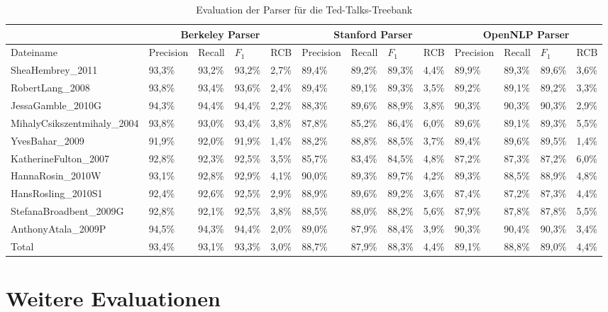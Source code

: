 \begin{sidewaystable}

\begin{tabular}{ | l || l | l | l | l || l | l | l | l || l | l | l | l |}
	\hline
	& \multicolumn{4}{|c||}{Berkeley Parser} & \multicolumn{4}{|c||}{Stanford Parser} & \multicolumn{4}{|c|}{OpenNLP Parser}\\ \hline
	Dateiname & Precision & Recall & \( F_1 \) & RCB & Precision & Recall & \( F_1 \) & RCB & Precision & Recall & \( F_1 \) & RCB  \\
	\hline \hline
	SheaHembrey\_2011 & 93,3\%  & 93,2\% & 93,2\% & 2,7\% & 89,4\% & 89,2\% & 89,3\% & 4,4\% & 89,9\% & 89,3\% & 89,6\% & 3,6\%\\ \hline
	RobertLang\_2008 & 93,8\% & 93,4\% & 93,6\% & 2,4\% & 89,4\% & 89,1\% & 89,3\% & 3,5\% & 89,2\% & 89,1\% & 89,2\% & 3,3\% \\ \hline
	JessaGamble\_2010G & 94,3\% & 94,4\% & 94,4\% & 2,2\% & 88,3\% & 89,6\% & 88,9\% & 3,8\% & 90,3\% & 90,3\% & 90,3\% & 2,9\% \\ \hline
	MihalyCsikszentmihaly\_2004 & 93,8\% & 93,0\% & 93,4\% & 3,8\% & 87,8\% & 85,2\% & 86,4\% & 6,0\% & 89,6\% & 89,1\% & 89,3\% & 5,5\% \\ \hline
	YvesBahar\_2009 & 91,9\% & 92,0\% & 91,9\% & 1,4\% & 88,2\% & 88,8\% & 88,5\% & 3,7\% & 89,4\% & 89,6\% & 89,5\% & 1,4\% \\ \hline
	KatherineFulton\_2007 & 92,8\% & 92,3\% & 92,5\% & 3,5\% & 85,7\% & 83,4\% & 84,5\% & 4,8\% & 87,2\% & 87,3\% & 87,2\% & 6,0\% \\ \hline
	HannaRosin\_2010W & 93,1\% & 92,8\% & 92,9\% & 4,1\% & 90,0\% & 89,3\% & 89,7\% & 4,2\% & 89,3\% & 88,5\% & 88,9\% & 4,8\% \\ \hline
	HansRosling\_2010S1 & 92,4\% & 92,6\% & 92,5\% & 2,9\% & 88,9\% & 89,6\% & 89,2\% & 3,6\% & 87,4\% & 87,2\% & 87,3\% & 4,4\% \\ \hline
	StefanaBroadbent\_2009G & 92,8\% & 92,1\% & 92,5\% & 3,8\% & 88,5\% & 88,0\% & 88,2\% & 5,6\% & 87,9\% & 87,8\% & 87,8\% & 5,5\% \\ \hline
	AnthonyAtala\_2009P & 94,5\% & 94,3\% & 94,4\% & 2,0\% & 89,0\% & 87,9\% & 88,4\% & 3,9\% & 90,3\% & 90,4\% & 90,3\% & 3,4\% \\ \hline \hline
	Total & 93,4\% & 93,1\% & 93,3\% & 3,0\% & 88,7\% & 87,9\% & 88,3\% & 4,4\% & 89,1\% & 88,8\% & 89,0\% & 4,4\% \\ \hline
\end{tabular}
\caption{Evaluation der Parser für die Ted-Talks-Treebank} 
\label{tab:eval-parser}
\end{sidewaystable} 

\section{Weitere Evaluationen}

